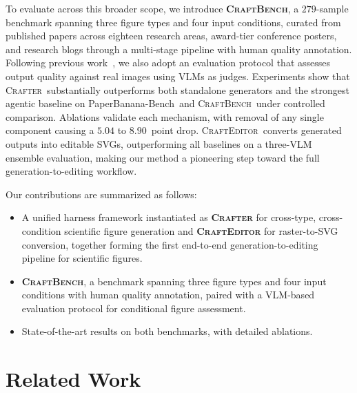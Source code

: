 \documentclass{llmxive}
\providecommand{\Crafter}{\textsc{Crafter}\xspace}
\providecommand{\Editor}{\textsc{CraftEditor}\xspace}
\providecommand{\CrafterBench}{\textsc{CraftBench}\xspace}
\providecommand{\PaperBananaBench}{PaperBanana-Bench\xspace}
\begin{document}
To evaluate across this broader scope, we introduce \textbf{\CrafterBench}, a $279$-sample benchmark spanning three figure types and four input conditions, curated from published papers across eighteen research areas, award-tier conference posters, and research blogs through a multi-stage pipeline with human quality annotation. Following previous work~\citep{zhu2026paperbanana}, we also adopt an evaluation protocol that assesses output quality against real images using VLMs as judges. Experiments show that \Crafter\ substantially outperforms both standalone generators and the strongest agentic baseline on \PaperBananaBench\ and \CrafterBench\ under controlled comparison. Ablations validate each mechanism, with removal of any single component causing a $5.04$ to $8.90$~point drop. \Editor\ converts generated outputs into editable SVGs, outperforming all baselines on a three-VLM ensemble evaluation, making our method a pioneering step toward the full generation-to-editing workflow.

Our contributions are summarized as follows:
\begin{itemize}[leftmargin=1.2em, itemsep=0pt, topsep=0pt, parsep=0pt]
  \item A unified harness framework instantiated as \textbf{\Crafter}
  for cross-type, cross-condition scientific figure generation and
  \textbf{\Editor} for raster-to-SVG conversion, together forming the
  first end-to-end generation-to-editing pipeline for scientific figures.
  \item \textbf{\CrafterBench}, a benchmark spanning three
  figure types and four input conditions with human quality annotation,
  paired with a VLM-based evaluation protocol for conditional figure
  assessment.
  \item State-of-the-art results on both benchmarks, with detailed
  ablations.
\end{itemize}


\section{Related Work}
\label{sec:related}
 
\end{document}
